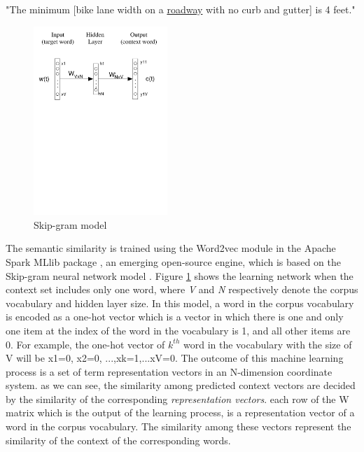\documentclass[Journal,InsideFigs, DoubleSpace]{ascelike} %
\begin{document}
%
\begin{center}
	"The minimum [bike lane width on a \underline{roadway} with no curb and gutter] is 4 feet."
\end{center}
%
%
\begin{figure}[t]
	\centering
	\includegraphics[width=0.45\textwidth]{Figure4_skip-gram-model}
	\caption{Skip-gram model}
	\label{fig:skip-gram}
\end{figure}
%
The semantic similarity is trained using the Word2vec module in the Apache Spark MLlib package \cite{apache16}, an emerging open-source engine, which is based on the Skip-gram neural network model \cite{mikolov13a}. Figure \ref{fig:skip-gram} shows the learning network when the context set includes only one word, where \textit{V} and \textit{N} respectively denote the corpus vocabulary and hidden layer size. In this model, a word in the corpus vocabulary is encoded as a one-hot vector which is a vector in which there is one and only one item at the index of the word in the vocabulary is 1, and all other items are 0. For example, the one-hot vector of $k^{th}$ word in the vocabulary with the size of V will be {x1=0, x2=0, ...,xk=1,...xV=0}. The outcome of this machine learning process is a set of term representation vectors  in an N-dimension coordinate system. as we can see, the similarity among predicted context vectors are decided by the similarity of the corresponding \textit{representation vectors}. each row of the W matrix which is the output of the learning process, is a representation vector of a word in the corpus vocabulary. The similarity among these vectors represent the similarity of the context of the corresponding words. 
\end{document}
